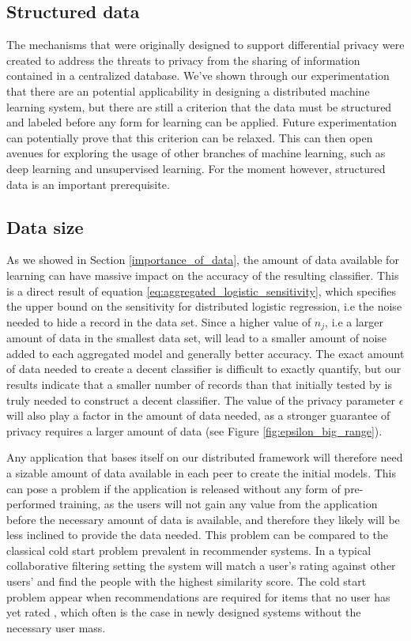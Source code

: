 \subsection{Structured data}
The mechanisms that were originally designed to support differential privacy were created to address the threats to privacy from the sharing of information contained in a centralized database. We've shown through our experimentation that there are an potential applicability in designing a distributed machine learning system, but there are still a criterion that the data must be structured and labeled before any form for learning can be applied. Future experimentation can potentially prove that this criterion can be relaxed. This can then open avenues for exploring the usage of other branches of machine learning, such as deep learning and unsupervised learning. For the moment however, structured data is an important prerequisite.

\subsection{Data size}
As we showed in Section \ref{importance_of_data}, the amount of data available for learning can have massive impact on the accuracy of the resulting classifier. This is a direct result of equation \ref{eq:aggregated_logistic_sensitivity}, which specifies the upper bound on the sensitivity for distributed logistic regression, i.e the noise needed to hide a record in the data set. Since a higher value of $n_j$, i.e a larger amount of data in the smallest data set, will lead to a smaller amount of noise added to each aggregated model and generally better accuracy. The exact amount of data needed to create a decent classifier is difficult to exactly quantify, but our results indicate that a smaller number of records than that initially tested by \cite{pathak2010diffprivhomo} is truly needed to construct a decent classifier. The value of the privacy parameter $\epsilon$ will also play a factor in the amount of data needed, as a stronger guarantee of privacy requires a larger amount of data (see Figure \ref{fig:epsilon_big_range}).

Any application that bases itself on our distributed framework will therefore need a sizable amount of data available in each peer to create the initial models. This can pose a problem if the application is released without any form of pre-performed training, as the users will not gain any value from the application before the necessary amount of data is available, and therefore they likely will be less inclined to provide the data needed. This problem can be compared to the classical cold start problem prevalent in recommender systems. In a typical collaborative filtering setting the system will match a user's rating against other users' and find the people with the highest similarity score. The cold start problem appear when recommendations are required for items that no user has yet rated \citep{schein2002methods}, which often is the case in newly designed systems without the necessary user mass. 



